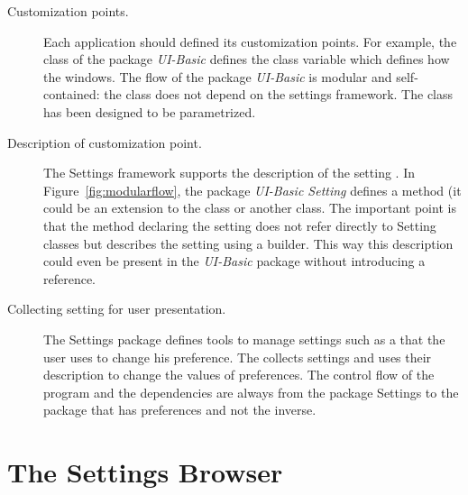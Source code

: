 \documentclass[a4paper,10pt,twoside]{book}
\begin{document}
\begin{description}
\item[Customization points.] Each application should defined its customization points. For example, the class  of the package \emph{UI-Basic} defines the class variable  which defines how the windows. The flow of the package \emph{UI-Basic} is modular and self-contained: the class  does not depend on the settings framework.  The class   has been designed to be parametrized.

\item[Description of customization point.] The Settings framework supports the description of the setting . In Figure~\ref{fig:modularflow}, the package \emph{UI-Basic Setting} defines a method (it could be an extension to the class  or another class. The important point is that the method declaring the setting does not refer directly to Setting classes but describes the setting using a builder. This way this description could even be present in the \emph{UI-Basic} package without introducing a reference.

\item[Collecting setting for user presentation.] The Settings package defines tools to manage settings such as a \setbrowser that the user uses to change his preference. The \setbrowser collects settings and uses their description to change the values of preferences.
The control flow of the program and the dependencies are always from the package Settings to the package that has preferences and not the inverse. 
\end{description}

\section{The Settings Browser}
\label{sec:TheSettingsBrowser}
\end{document}
